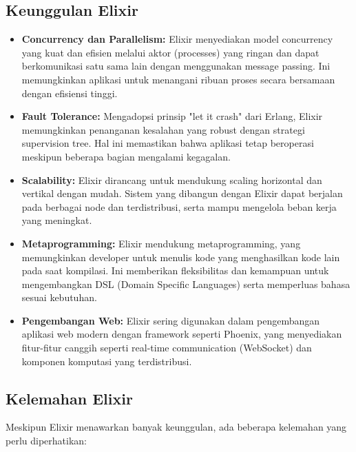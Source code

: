 \subsection{Keunggulan Elixir}

\begin{itemize}
	\item \textbf{Concurrency dan Parallelism:} Elixir menyediakan model concurrency yang kuat dan efisien melalui aktor (processes) yang ringan dan dapat berkomunikasi satu sama lain dengan menggunakan message passing. Ini memungkinkan aplikasi untuk menangani ribuan proses secara bersamaan dengan efisiensi tinggi.
	
	\item \textbf{Fault Tolerance:} Mengadopsi prinsip "let it crash" dari Erlang, Elixir memungkinkan penanganan kesalahan yang robust dengan strategi supervision tree. Hal ini memastikan bahwa aplikasi tetap beroperasi meskipun beberapa bagian mengalami kegagalan.
	
	\item \textbf{Scalability:} Elixir dirancang untuk mendukung scaling horizontal dan vertikal dengan mudah. Sistem yang dibangun dengan Elixir dapat berjalan pada berbagai node dan terdistribusi, serta mampu mengelola beban kerja yang meningkat.
	
	\item \textbf{Metaprogramming:} Elixir mendukung metaprogramming, yang memungkinkan developer untuk menulis kode yang menghasilkan kode lain pada saat kompilasi. Ini memberikan fleksibilitas dan kemampuan untuk mengembangkan DSL (Domain Specific Languages) serta memperluas bahasa sesuai kebutuhan.
	
	\item \textbf{Pengembangan Web:} Elixir sering digunakan dalam pengembangan aplikasi web modern dengan framework seperti Phoenix, yang menyediakan fitur-fitur canggih seperti real-time communication (WebSocket) dan komponen komputasi yang terdistribusi.
\end{itemize}

\subsection{Kelemahan Elixir}

Meskipun Elixir menawarkan banyak keunggulan, ada beberapa kelemahan yang perlu diperhatikan:

